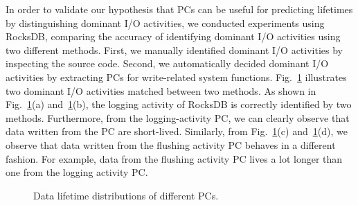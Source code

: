 In order to validate our hypothesis that PCs can be useful for predicting 
lifetimes by distinguishing dominant I/O activities, 
we conducted experiments using RocksDB, comparing the accuracy of 
identifying dominant I/O activities using two different methods.
First, we manually identified dominant I/O activities by inspecting 
the source code. Second, we automatically decided dominant I/O 
activities by extracting PCs for write-related system functions. 
Fig.~\ref{fig:types_and_PCs} illustrates two dominant I/O activities 
matched between two methods.   
As shown in Fig.~\ref{fig:types_and_PCs}(a) and~\ref{fig:types_and_PCs}(b), 
the logging activity of RocksDB is correctly identified by two methods.  
Furthermore, from the logging-activity PC, we can clearly observe that data 
written from the PC are short-lived.   
Similarly, from Fig.~\ref{fig:types_and_PCs}(c) and~\ref{fig:types_and_PCs}(d), 
we observe that data written from the flushing activity PC behaves in a different fashion.  
For example, data from the flushing activity PC lives 
a lot longer than one from the logging activity PC.

\begin{figure}[!t]
\centering
\vspace{-10pt}
\hfill
\hfill
\vspace{-10pt}
\vspace{-10pt}
\caption{Data lifetime distributions of different PCs.} 
\label{fig:types_and_PCs}
\vspace{-15pt}
\end{figure}


